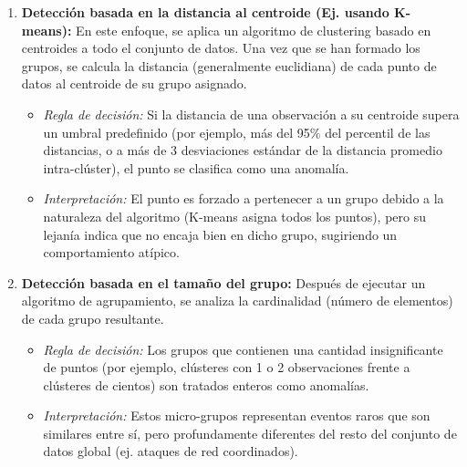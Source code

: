 \begin{enumerate}
    \item \textbf{Detección basada en la distancia al centroide (Ej. usando K-means):}
    En este enfoque, se aplica un algoritmo de clustering basado en centroides a todo el conjunto de datos. Una vez que se han formado los grupos, se calcula la distancia (generalmente euclidiana) de cada punto de datos al centroide de su grupo asignado.
    \begin{itemize}
        \item \textit{Regla de decisión:} Si la distancia de una observación a su centroide supera un umbral predefinido (por ejemplo, más del 95\% del percentil de las distancias, o a más de 3 desviaciones estándar de la distancia promedio intra-clúster), el punto se clasifica como una anomalía. 
        \item \textit{Interpretación:} El punto es forzado a pertenecer a un grupo debido a la naturaleza del algoritmo (K-means asigna todos los puntos), pero su lejanía indica que no encaja bien en dicho grupo, sugiriendo un comportamiento atípico.
    \end{itemize}

    \item \textbf{Detección basada en el tamaño del grupo:}
    Después de ejecutar un algoritmo de agrupamiento, se analiza la cardinalidad (número de elementos) de cada grupo resultante.
    \begin{itemize}
        \item \textit{Regla de decisión:} Los grupos que contienen una cantidad insignificante de puntos (por ejemplo, clústeres con 1 o 2 observaciones frente a clústeres de cientos) son tratados enteros como anomalías.
        \item \textit{Interpretación:} Estos micro-grupos representan eventos raros que son similares entre sí, pero profundamente diferentes del resto del conjunto de datos global (ej. ataques de red coordinados).
    \end{itemize}


\end{enumerate}
